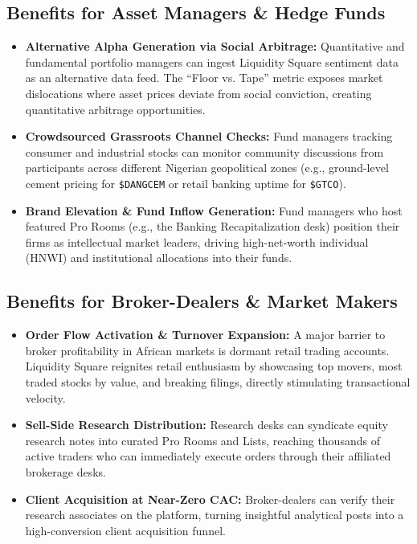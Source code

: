 \documentclass[11pt,a4paper]{article}
\begin{document}
\subsection{Benefits for Asset Managers \& Hedge Funds}
\begin{itemize}
    \item \textbf{Alternative Alpha Generation via Social Arbitrage:} Quantitative and fundamental portfolio managers can ingest Liquidity Square sentiment data as an alternative data feed. The ``Floor vs. Tape'' metric exposes market dislocations where asset prices deviate from social conviction, creating quantitative arbitrage opportunities.
    \item \textbf{Crowdsourced Grassroots Channel Checks:} Fund managers tracking consumer and industrial stocks can monitor community discussions from participants across different Nigerian geopolitical zones (e.g., ground-level cement pricing for \texttt{\$DANGCEM} or retail banking uptime for \texttt{\$GTCO}).
    \item \textbf{Brand Elevation \& Fund Inflow Generation:} Fund managers who host featured Pro Rooms (e.g., the Banking Recapitalization desk) position their firms as intellectual market leaders, driving high-net-worth individual (HNWI) and institutional allocations into their funds.
\end{itemize}

\subsection{Benefits for Broker-Dealers \& Market Makers}
\begin{itemize}
    \item \textbf{Order Flow Activation \& Turnover Expansion:} A major barrier to broker profitability in African markets is dormant retail trading accounts. Liquidity Square reignites retail enthusiasm by showcasing top movers, most traded stocks by value, and breaking filings, directly stimulating transactional velocity.
    \item \textbf{Sell-Side Research Distribution:} Research desks can syndicate equity research notes into curated Pro Rooms and Lists, reaching thousands of active traders who can immediately execute orders through their affiliated brokerage desks.
    \item \textbf{Client Acquisition at Near-Zero CAC:} Broker-dealers can verify their research associates on the platform, turning insightful analytical posts into a high-conversion client acquisition funnel.
\end{itemize}
\end{document}
